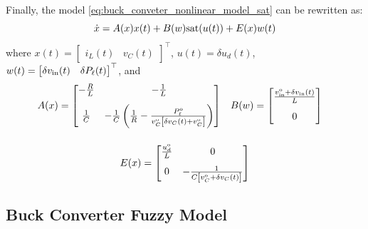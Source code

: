 Finally, the model \eqref{eq:buck_conveter_nonlinear_model_sat} can be rewritten as:
\begin{equation}
  \dot x = A(x) x(t) + B(w) {\rm sat}(u(t)) + E(x) w(t)
  \label{eq:buck_conveter_nonlinear_model_ssm}
\end{equation}
where $x(t) = \begin{bmatrix}i_L(t) & v_C(t)\end{bmatrix}^{\top}$, $u(t) = \delta u_d(t)$, $w(t) = \begin{bmatrix} \delta v_{\rm in}(t) & \delta P_{\ell}(t)\end{bmatrix}^{\top}$, and
\begin{gather}
  \notag
  \begin{align}
    A(x) & = \begin{bmatrix}
               - \frac{R}{L} & - \frac{1}{L}                                                                   \\[8pt]
               \frac{1}{C}   & - \frac{1}{C}\left(\frac{1}{R} - \frac{P_{\ell}^{\rm o}}{v_C^{\rm o} \left[\delta v_C(t) + v_C^{\rm o}\right]}\right)
             \end{bmatrix} &
    B(w) & = \begin{bmatrix}
               \frac{v_{\rm{in}}^{\rm o} +\delta v_{\rm{in}}(t)}{L} \\[8pt] 0
             \end{bmatrix}
  \end{align}
  \\[12pt]
  E(x) = \begin{bmatrix}
    \frac{u_d^{\rm o}}{L} & 0 \\[8pt] 0 &  - \frac{1}{C \left[v_C^{\rm o} + \delta v_C(t)\right] }
  \end{bmatrix}
  \label{eq:buck_conveter_nonlinear_model_ssm_e}
\end{gather}

\subsection{Buck Converter Fuzzy Model}

